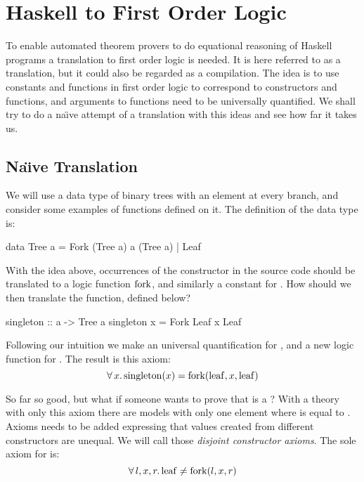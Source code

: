 \chapter{Haskell to First Order Logic}
\label{ch:translation}

To enable automated theorem provers to do equational reasoning of
Haskell programs a translation to first order logic is needed. It is
here referred to as a translation, but it could also be regarded as a
compilation. The idea is to use constants and functions in first order
logic to correspond to constructors and functions, and arguments to
functions need to be universally quantified. We shall try to do a
na\"{\i}ve attempt of a translation with this ideas and see how far it
takes us.

\section{Na\"{\i}ve Translation}
\label{sec:treetrans}

We will use a data type of binary trees with an element at every
branch, and consider some examples of functions defined on it. The
definition of the data type is:

\begin{code}
data Tree a = Fork (Tree a) a (Tree a) | Leaf
\end{code}

\noindent
With the idea above, occurrences of the  constructor in the
source code should be translated to a logic function $\mathrm{fork}$, and
similarly a constant for . How should we then translate the
 function, defined below?

\begin{code}
singleton :: a -> Tree a
singleton x = Fork Leaf x Leaf
\end{code}

\noindent
Following our intuition we make an universal quantification for
, and a new logic function for . The result
is this axiom:
\begin{equation*}
\forall \, x . \, \mathrm{singleton}(x) = \mathrm{fork}(\mathrm{leaf},x,\mathrm{leaf})
\end{equation*}

\noindent
So far so good, but what if someone wants to prove that  is a ? With a theory with only this axiom there are
models with only one element where  is equal to
. Axioms needs to be added expressing that values created
from different constructors are unequal. We will call those
\emph{disjoint constructor axioms}. The sole axiom for  is:
\begin{equation*}
\forall \, l , x , r . \, \mathrm{leaf} \neq \mathrm{fork}(l,x,r)
\end{equation*}

